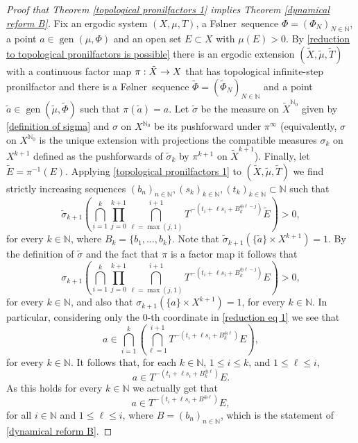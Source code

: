 \documentclass[letter, 11pt]{article}
\newcommand{\Folner}{F\o{}lner}
\theoremstyle{definition}
\theoremstyle{plain}
\newcommand{\N}{\mathbb{N}}
\DeclareMathOperator\gen{gen}
\newcommand{\1}{\mathbbm{1}}
\begin{document}
\begin{proof}[Proof that Theorem \ref{topological pronilfactors 1} implies 
Theorem \ref{dynamical reform B}]
Fix an ergodic system $(X,\mu,T)$, a \Folner\ sequence $\Phi=(\Phi_N)_{N\in \N}$, a point $a\in \gen(\mu,\Phi)$ and an open set $E\subset X$ with $\mu(E)>0$. By \cref{reduction to topological pronilfactors is possible} there is an ergodic extension $(\tilde{X},\tilde{\mu},\tilde{T})$ with a continuous factor map $\pi: \Tilde{X} \to X$ that has topological infinite-step pronilfactor and there is a \Folner\ sequence $\tilde{\Phi}=(\tilde{\Phi}_N)_{N\in \N}$ and a point $\tilde{a}\in \gen(\tilde{\mu},\tilde{\Phi})$ such that $\pi(\tilde{a})=a$. Let $\tilde{\sigma}$ be the measure on $\tilde{X}^{\N_0}$ given by \cref{definition of sigma} and $\sigma$ on $X^{\N_0}$ be its pushforward under $\pi^{\infty}$ (equivalently, $\sigma$ on $X^{\N_0}$ is the unique extension with projections the compatible measures $\sigma_k$ on $X^{k+1}$ defined as the pushforwards of $\tilde{\sigma}_k$ by $\pi^{k+1}$ on $\tilde{X}^{k+1}$). Finally, let $\tilde{E}=\pi^{-1}(E)$. Applying \cref{topological pronilfactors 1} to $(\tilde{X},\tilde{\mu},\tilde{T})$ we find strictly increasing 
sequences $(b_n)_{n\in \N}, (s_k)_{k\in \N}, (t_k)_{k\in \N}\subset \N$ such 
that 
$$\tilde{\sigma}_{k+1}\left(\bigcap_{i=1}^k  \prod_{j=0}^{k+1}  \bigcap_{\ell=\max(j,1)}^{i+1}  T^{-\left( t_i+\ell s_i+ B_{k}^{\oplus \ell-j}  \right)} \tilde{ E}   \right)>0,$$
for every $k\in \N$, where $B_k=\{b_1,\ldots,b_k\}$. Note that $\tilde{\sigma}_{k+1}(\{\tilde{a}\}\times X^{k+1})=1$.
By the definition of $\tilde{\sigma}$ and the fact that $\pi$ is a factor map it follows that  
\begin{equation}\label{reduction eq 1}
\sigma_{k+1}\left(\bigcap_{i=1}^k  \prod_{j=0}^{k+1}  \bigcap_{\ell=\max(j,1)}^{i+1}  T^{-\left( t_i+\ell s_i+ B_{k}^{\oplus \ell-j}  \right)} E   \right)>0,
\end{equation}
for every $k\in \N$, and also that $\sigma_{k+1}(\{a\}\times X^{k+1})=1$, for every $k\in \N$. In particular, considering only the $0$-th coordinate in \eqref{reduction eq 1} we see that 
$$a\in \bigcap_{i=1}^k    \left(\bigcap_{\ell=1}^{i+1}  T^{-\left( t_i+\ell s_i+ B_{k}^{\oplus \ell}  \right)} E \right),$$
for every $k\in \N$. It follows that, for each $k\in \N$, $1\leq i\leq k$, and $1 \leq \ell \leq i$, 
$$a \in T^{-(t_i+\ell s_i + B_k^{\oplus \ell})}  E.  $$
As this holds for every $k\in \N$ we actually get that 
$$a \in T^{-(t_i+\ell s_i + B^{\oplus \ell})}E,  $$
for all $i\in \N$ and $1\leq \ell \leq i$, where $B=(b_n)_{n\in \N}$, which is the statement of \cref{dynamical reform B}.
\end{proof}
\end{document}
